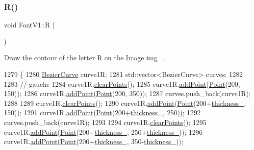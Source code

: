 \subsubsection{\texorpdfstring{R()}{R()}}
{\footnotesize\ttfamily void Font\+V1\+::R (\begin{DoxyParamCaption}{ }\end{DoxyParamCaption})}



Draw the contour of the letter R on the \mbox{\hyperlink{class_image}{Image}} img\+\_\+. 


\begin{DoxyCode}
1279               \{
1280     \mbox{\hyperlink{class_bezier_curve}{BezierCurve}} curve1R;
1281     std::vector<BezierCurve> curves;
1282 
1283     \textcolor{comment}{// gauche}
1284     curve1R.\mbox{\hyperlink{class_bezier_curve_a0ba8ce66d5af5971ae6a1b506029728e}{clearPoints}}();
1285     curve1R.\mbox{\hyperlink{class_bezier_curve_a38d16c18b36ae45619b05e26e226cf34}{addPoint}}(\mbox{\hyperlink{class_point}{Point}}(200, 150));
1286     curve1R.\mbox{\hyperlink{class_bezier_curve_a38d16c18b36ae45619b05e26e226cf34}{addPoint}}(\mbox{\hyperlink{class_point}{Point}}(200, 350));
1287     curves.push\_back(curve1R);
1288 
1289     curve1R.\mbox{\hyperlink{class_bezier_curve_a0ba8ce66d5af5971ae6a1b506029728e}{clearPoints}}();
1290     curve1R.\mbox{\hyperlink{class_bezier_curve_a38d16c18b36ae45619b05e26e226cf34}{addPoint}}(\mbox{\hyperlink{class_point}{Point}}(200+\mbox{\hyperlink{class_font_v1_aed8040e76be9a52833627b92f0fb4e5f}{thickness\_}}, 150));
1291     curve1R.\mbox{\hyperlink{class_bezier_curve_a38d16c18b36ae45619b05e26e226cf34}{addPoint}}(\mbox{\hyperlink{class_point}{Point}}(200+\mbox{\hyperlink{class_font_v1_aed8040e76be9a52833627b92f0fb4e5f}{thickness\_}}, 250));
1292     curves.push\_back(curve1R);
1293 
1294     curve1R.\mbox{\hyperlink{class_bezier_curve_a0ba8ce66d5af5971ae6a1b506029728e}{clearPoints}}();
1295     curve1R.\mbox{\hyperlink{class_bezier_curve_a38d16c18b36ae45619b05e26e226cf34}{addPoint}}(\mbox{\hyperlink{class_point}{Point}}(200+\mbox{\hyperlink{class_font_v1_aed8040e76be9a52833627b92f0fb4e5f}{thickness\_}}, 250+\mbox{\hyperlink{class_font_v1_aed8040e76be9a52833627b92f0fb4e5f}{thickness\_}}));
1296     curve1R.\mbox{\hyperlink{class_bezier_curve_a38d16c18b36ae45619b05e26e226cf34}{addPoint}}(\mbox{\hyperlink{class_point}{Point}}(200+\mbox{\hyperlink{class_font_v1_aed8040e76be9a52833627b92f0fb4e5f}{thickness\_}}, 350-\mbox{\hyperlink{class_font_v1_aed8040e76be9a52833627b92f0fb4e5f}{thickness\_}}));

\end{DoxyCode}
